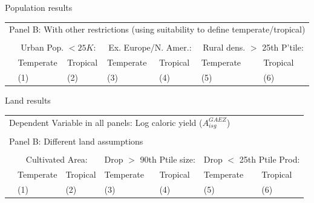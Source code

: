 \documentclass[10pt, xcolor=dvipsnames]{beamer}
\begin{document}
\begin{frame}{Population results}\label{popreg}
{\footnotesize
\begin{tabularx}{\textwidth}{lXXXXXX}
\midrule
\multicolumn{7}{l}{Panel B: With other restrictions (using suitability to define temperate/tropical)} \\ \\
 & \multicolumn{2}{c}{Urban Pop. $<25K$:} & \multicolumn{2}{c}{Ex. Europe/N. Amer.:} & \multicolumn{2}{c}{Rural dens. $>$ 25th P'tile:}\\ \cmidrule(lr){2-3} \cmidrule(lr){4-5} \cmidrule(lr){6-7}
 & Temperate & Tropical & Temperate  & Tropical  & Temperate  & Tropical \\
 & (1) & (2) & (3) & (4) & (5) & (6) \\
\midrule

\midrule
\end{tabularx}
}

\hfill \hyperlink{pop}{}
\end{frame}


\begin{frame}{Land results}\label{landreg}
{\footnotesize
\begin{tabularx}{\textwidth}{lXXXXXX}
\midrule
\multicolumn{7}{l}{Dependent Variable in all panels: Log caloric yield ($A^{GAEZ}_{isg}$)} \\ \\
\multicolumn{7}{l}{Panel B: Different land assumptions} \\ \\
 & \multicolumn{2}{c}{Cultivated Area:} & \multicolumn{2}{c}{Drop $>$ 90th Ptile size:} & \multicolumn{2}{c}{Drop $<$ 25th Ptile Prod:}\\ \cmidrule(lr){2-3} \cmidrule(lr){4-5} \cmidrule(lr){6-7}
 & Temperate & Tropical & Temperate  & Tropical  & Temperate  & Tropical \\
 & (1) & (2) & (3) & (4) & (5) & (6) \\
\midrule

\midrule
\end{tabularx}
}

\hfill \hyperlink{land}{}
\end{frame}
\end{document}
